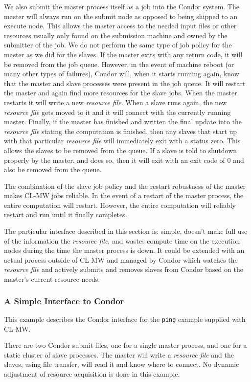 \documentclass[titlepage,12pt]{book}
\newcommand{\xsmall}{\latexhtml{\small}{}}
\newcommand{\xnormalsize}{\latexhtml{\normalsize}{}}
\newcommand{\clmw}{\xsmall\textsc{CL-MW}\xnormalsize\xspace}
\newcommand{\rfile}{\textit{resource file}\xspace}
\newcommand{\exec}[1]{\texttt{#1}\xspace}
\begin{document}
We also submit the master process itself as a job into the Condor
system. The master will always run on the submit node as opposed to
being shipped to an execute node. This allows the master access to
the needed input files or other resources usually only found on the
submission machine and owned by the submitter of the job. We do not
perform the same type of job policy for the master as we did for the
slaves. If the master exits with any return code, it will be removed
from the job queue. However, in the event of machine reboot (or many
other types of failures), Condor will, when it starts running again,
know that the master and slave processes were present in the job
queue. It will restart the master and again find more resources
for the slave jobs. When the master restarts it will write a new
\rfile. When a slave runs again, the new \rfile gets moved to it
and it will connect with the currently running master. Finally,
if the master has finished and written the final update into the
\rfile stating the computation is finished, then any slaves that
start up with that particular \rfile will immediately exit with a
status zero. This allows the slaves to be removed from the queue. If
a slave is told to shutdown properly by the master, and does so, then
it will exit with an exit code of 0 and also be removed from the queue.

The combination of the slave job policy and the restart robustness
of the master makes \clmw jobs reliable. In the event of a restart
of the master process, the entire computation will restart. However,
the entire computation will reliably restart and run until it finally
completes.

The particular interface described in this section is: simple, doesn't
make full use of the information the \rfile, and wastes compute time
on the execution nodes during the time the master process is down. It
could be extended with an actual process outside of \clmw and managed
by Condor which watches the \rfile and actively submits and removes
slaves from Condor based on the master's current resource needs.

\subsubsection{A Simple Interface to Condor}

This example describes the Condor interface for the \exec{ping}
example supplied with \clmw.

There are two Condor submit files, one for a single master process,
and one for a static cluster of slave processes. The master will write
a \rfile and the slaves, using file transfer, will read it and know
where to connect.  No dynamic adjustment of resource acquisition is
done in this example.
\end{document}
